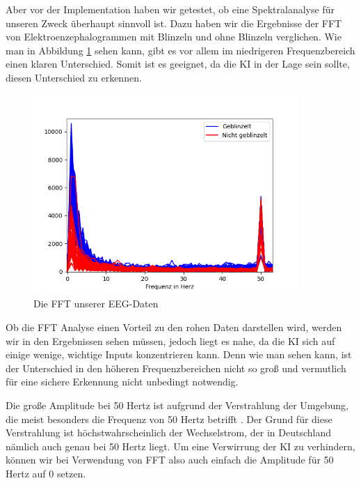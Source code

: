 \documentclass[10pt]{scrartcl}
\begin{document}
	Aber vor der Implementation haben wir getestet, ob eine Spektralanalyse für unseren Zweck überhaupt sinnvoll ist. Dazu haben wir die Ergebnisse der FFT von Elektroenzephalogrammen mit Blinzeln und ohne Blinzeln verglichen. Wie man in Abbildung \ref{EEG-FFT} sehen kann, gibt es vor allem im niedrigeren Frequenzbereich einen klaren Unterschied. %
	Somit ist es geeignet, da die KI in der Lage sein sollte, diesen Unterschied zu erkennen.

	\begin{figure}[H]
		\centering
		\includegraphics[width=0.9\textwidth]{pictures/Die_FFTs_der_EEG-Daten.png}
		\caption{Die FFT unserer EEG-Daten}
		\label{EEG-FFT}
	\end{figure}
	
	Ob die FFT Analyse einen Vorteil zu den rohen Daten darstellen wird, werden wir in den Ergebnissen sehen müssen, jedoch liegt es nahe, da die KI sich auf einige wenige, wichtige Inputs konzentrieren kann. Denn wie man sehen kann, ist der Unterschied in den höheren Frequenzbereichen nicht so groß und vermutlich für eine sichere Erkennung nicht unbedingt notwendig.

	Die große Amplitude bei 50 Hertz ist aufgrund der Verstrahlung der Umgebung, die meist besonders die Frequenz von 50 Hertz betrifft \cite{Praktikum}. Der Grund für diese Verstrahlung ist höchstwahrscheinlich der Wechselstrom, der in Deutschland nämlich auch genau bei 50 Hertz liegt. Um eine Verwirrung der KI zu verhindern, können wir bei Verwendung von FFT also auch einfach die Amplitude für 50 Hertz auf 0 setzen.
\end{document}
